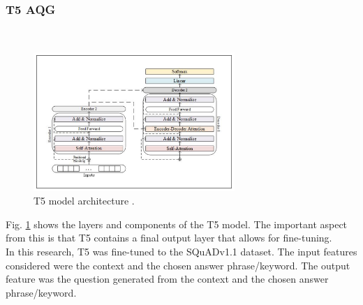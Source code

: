 \documentclass[conference]{IEEEtran}
\begin{document}
        \subsubsection{T5 AQG}
            \hfill \\
            \vspace{-0.5cm}
            \begin{figure}[H]
                \centerline{\includegraphics[width=3in]{t5arch.png}}
                \vspace{-0.4cm}
                \caption{T5 model architecture \cite{Wang2023}.} 
                \label{t5architecture}
            \end{figure}
            \vspace{-0.4cm}
            \indent Fig. \ref{t5architecture} shows the 
            layers and components of the T5 model. 
            The important aspect from this is that T5 
            contains a final output layer that allows 
            for fine-tuning. \\ 
            \indent In this research, T5 was fine-tuned 
            to the SQuADv1.1 dataset. The input features 
            considered were the context and the chosen 
            answer phrase/keyword. The output feature
            was the question generated from the context
            and the chosen answer phrase/keyword. 
            
\end{document}
